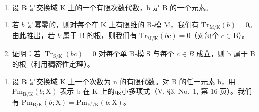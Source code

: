 
\begin{enumerate}
\def\labelenumi{\arabic{enumi})}
\tightlist
\item
  设 B 是交换域 K 上的一个有限次数代数，b 是 B 的一个元素。
\end{enumerate}

\begin{enumerate}
\def\labelenumi{\alph{enumi})}
\item
  若 \(b\) 是幂零的，则对每个在 K 上有限维的 B-模 M，我们有 \(\mathrm{Tr}_{\mathrm{M / K}}(b) = 0\)。由此推出，若 \(b\) 属于 B 的根，则我们有 \(\mathrm{Tr}_{\mathrm{M / K}}(bc) = 0\)（对每个 \(c \in \mathrm{B}\)）。
\item
  证明：若 \(\operatorname{Tr}_{\mathrm{S}/\mathrm{K}}(bc)=0\) 对每个单 B-模 S 与每个 \(c\in B\) 成立，则 b 属于 B 的根（利用稠密性定理）。
\end{enumerate}

\begin{enumerate}
\def\labelenumi{\arabic{enumi})}
\setcounter{enumi}{1}
\tightlist
\item
  设 B 是交换域 K 上一个次数为 n 的有限代数。对 B 的任一元素 b，用 \(\mathrm{Pm}_{\mathrm{B}/\mathrm{K}}(b;\mathrm{X})\) 表示 b 在 K 上的最小多项式（V, §3, No.~1, 第 16 页）。我们有 \(\mathrm{Pm}_{\mathrm{B}/\mathrm{K}}(b;\mathrm{X})=\mathrm{Pm}_{\mathrm{B}^{\circ}/\mathrm{K}}(b;\mathrm{X})\)。
\end{enumerate}

